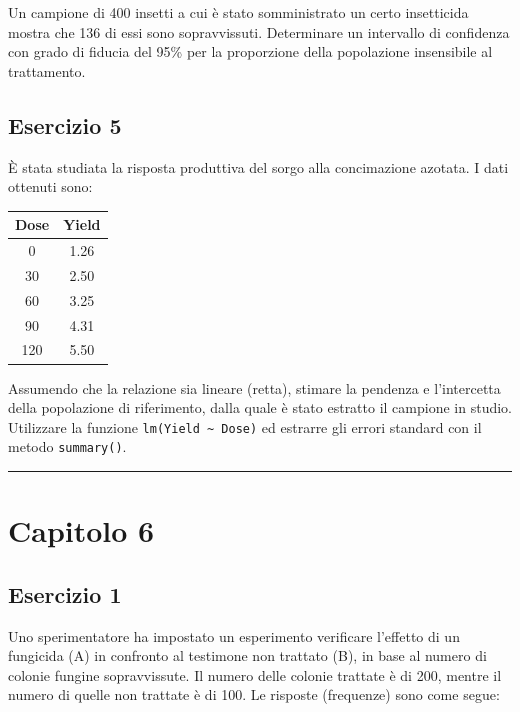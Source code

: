 \documentclass[a4paper,12pt,oneside]{book}
\begin{document}
Un campione di 400 insetti a cui è stato somministrato un certo insetticida mostra che 136 di essi sono sopravvissuti. Determinare un intervallo di confidenza con grado di fiducia del 95\% per la proporzione della popolazione insensibile al trattamento.

\hypertarget{esercizio-5-3}{%
\subsection{Esercizio 5}\label{esercizio-5-3}}

È stata studiata la risposta produttiva del sorgo alla concimazione azotata. I dati ottenuti sono:

\begin{longtable}[]{@{}cc@{}}
\toprule
Dose & Yield \\
\midrule
\endhead
0 & 1.26 \\
30 & 2.50 \\
60 & 3.25 \\
90 & 4.31 \\
120 & 5.50 \\
\bottomrule
\end{longtable}

Assumendo che la relazione sia lineare (retta), stimare la pendenza e l'intercetta della popolazione di riferimento, dalla quale è stato estratto il campione in studio. Utilizzare la funzione \texttt{lm(Yield\ \textasciitilde{}\ Dose)} ed estrarre gli errori standard con il metodo \texttt{summary()}.

\begin{center}\rule{0.5\linewidth}{0.5pt}\end{center}

\hypertarget{capitolo-6}{%
\section{Capitolo 6}\label{capitolo-6}}

\hypertarget{esercizio-1-4}{%
\subsection{Esercizio 1}\label{esercizio-1-4}}

Uno sperimentatore ha impostato un esperimento verificare l'effetto di un fungicida (A) in confronto al testimone non trattato (B), in base al numero di colonie fungine sopravvissute. Il numero delle colonie trattate è di 200, mentre il numero di quelle non trattate è di 100. Le risposte (frequenze) sono come segue:
\end{document}
